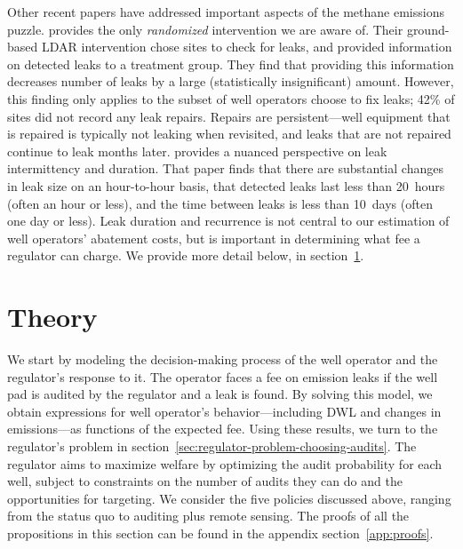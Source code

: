 \documentclass[12pt,oneside,letterpaper]{article}
\theoremstyle{definition}
\begin{document}
\begin{refsection}
Other recent papers have addressed important aspects of the methane emissions puzzle.
\textcite{Wang/Barlow/Funk/Robinson/Brandt/Ravikumar:2021}
provides the only \emph{randomized} intervention we are aware of.
Their ground-based \gls{LDAR} intervention chose sites to check for leaks, and provided information on detected leaks to a treatment group.
They find that providing this information decreases number of leaks by a large (statistically insignificant) amount.
However, this finding only applies to the subset of well operators choose to fix leaks; 42\% of sites did not record any leak repairs.
Repairs are persistent---well equipment that is repaired is typically not leaking when revisited, and leaks that are not repaired continue to leak months later.
\textcite{Wang/Daniels/Hammerling/Harrison/Burmaster/George/Ravikumar:2022} provides a nuanced perspective on leak intermittency and duration.
That paper finds that there are substantial changes in leak size on an hour-to-hour basis, that detected leaks last less than 20~hours (often an hour or less), and the time between leaks is less than 10~days (often one day or less).
Leak duration and recurrence is not central to our estimation of well operators' abatement costs, but is important in determining what fee a regulator can charge.
We provide more detail below, in section~\ref{sec:theory}.



\section{Theory}
\label{sec:theory}

We start by modeling the decision-making process of the well operator and the regulator's response to it.
The operator faces a fee on emission leaks if the well pad is audited by the regulator and a leak is found.
By solving this model, we obtain expressions for well operator's behavior---including \gls{DWL} and changes in emissions---as functions of the expected fee.
Using these results, we turn to the regulator's problem in section~\ref{sec:regulator-problem-choosing-audits}.
The regulator aims to maximize welfare by optimizing the audit probability for each well, subject to constraints on the number of audits they can do and the opportunities for targeting.
We consider the five policies discussed above, ranging from the status quo to auditing plus remote sensing.
The proofs of all the propositions in this section can be found in the appendix section~\ref{app:proofs}.



\end{refsection}
\end{document}
